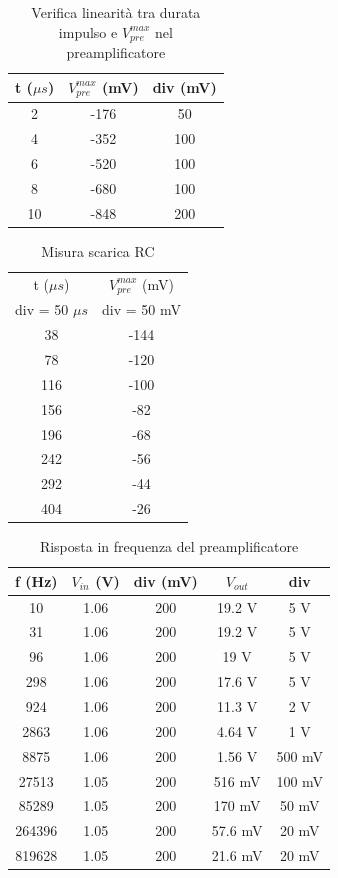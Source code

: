 \documentclass{article}
\begin{document}
\begin{table}[H]
    \centering
    \begin{tabular}{ccc}
        \toprule
        t ($\mu s$) & $V_{pre}^{max}$ (mV) & div (mV) \\
        \midrule
        2 & -176 & 50 \\
        4 & -352 & 100 \\
        6 & -520 & 100 \\
        8 & -680 & 100 \\
        10 & -848 & 200 \\
        \bottomrule
    \end{tabular}
    \caption{Verifica linearità tra durata impulso e $V_{pre}^{max}$ nel preamplificatore}
\end{table}

\begin{table}[H]
    \centering
    \begin{tabular}{cc}
        \toprule
        t ($\mu s$)& $V_{pre}^{max}$ (mV) \\
        div = 50 $\mu s$ & div = 50 mV\\
        \midrule
        38 & -144 \\
        78 & -120 \\
        116 & -100 \\
        156 & -82 \\
        196 & -68 \\
        242 & -56 \\
        292 & -44 \\
        404 & -26 \\
        \bottomrule
    \end{tabular}
    \caption{Misura scarica RC}
\end{table}

\begin{table}[H]
    \centering
    \begin{tabular}{ccccc}
        \toprule
        f (Hz) & $V_{in}$ (V) & div (mV) & $V_{out}$ & div\\
        \midrule
        10 & 1.06 & 200 & 19.2 V & 5 V\\
        31 & 1.06 & 200 & 19.2 V& 5 V\\
        96 & 1.06 & 200 & 19 V& 5 V\\
        298 & 1.06 & 200 & 17.6 V& 5 V\\
        924 & 1.06 & 200 & 11.3 V& 2 V\\
        2863 & 1.06 & 200 & 4.64 V& 1 V\\
        8875 & 1.06 & 200 & 1.56 V& 500 mV\\
        27513 & 1.05 & 200 & 516 mV& 100 mV\\
        85289 & 1.05 & 200 & 170 mV& 50 mV\\
        264396 & 1.05 & 200 & 57.6 mV & 20 mV\\
        819628 & 1.05 & 200 & 21.6 mV& 20 mV\\
        \bottomrule
    \end{tabular}
    \caption{Risposta in frequenza del preamplificatore}
\end{table}
\end{document}
